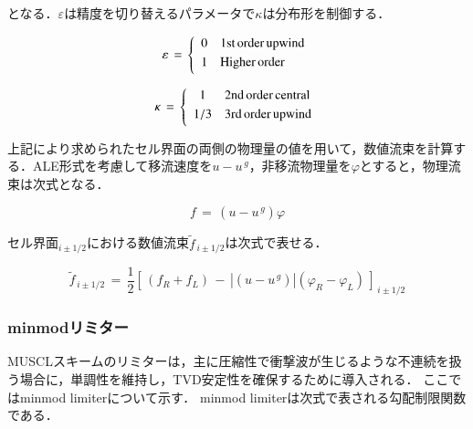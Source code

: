 \noindent となる．$\varepsilon$は精度を切り替えるパラメータで$\kappa$は分布形を制御する．

\begin{equation}
\varepsilon \,=\, \left\{
\begin{array}{cl}
\vspace{1mm}
0 & \mathrm{1st\, order\, upwind} \\
\vspace{1mm}
1 & \mathrm{Higher\, order} \\
\end{array} \right.
\label{eq:MUSCL parameter1}
\end{equation}

\begin{equation}
\kappa \,=\, \left\{
\begin{array}{cl}
\vspace{1mm}
1   & \mathrm{2nd\, order\,central} \\
\vspace{1mm}
1/3 & \mathrm{3rd\, order\,upwind} \\
\end{array} \right.
\label{eq:MUSCL parameter2}
\end{equation}

\noindent 上記により求められたセル界面の両側の物理量の値を用いて，数値流束を計算する．ALE形式を考慮して移流速度を$u-u^{\,g}$，非移流物理量を$\varphi$とすると，物理流束は次式となる．

\begin{equation}
f \,=\, \left( u - u^{\,g} \right) \varphi
\label{eq:physical flux ALE}
\end{equation}

\noindent セル界面${}_{i\pm1/2}$における数値流束$\tilde{f}_{\,i\pm1/2}$は次式で表せる．

\begin{equation}
\tilde{f}_{\,i\pm1/2} \,=\,
\frac{1}{2} { \left[ \, \left( f_R + f_L \right) \,-\, \left| (u-u^{\,g}) \right| \left( \varphi_R - \varphi_L \right) \, \right] }_{\,i\pm1/2}
\label{eq:general flux form}
\end{equation}

%
\subsubsection{minmodリミター}
MUSCLスキームのリミターは，主に圧縮性で衝撃波が生じるような不連続を扱う場合に，単調性を維持し，TVD安定性を確保するために導入される．
ここではminmod limiterについて示す．
minmod limiterは次式で表される勾配制限関数である．

